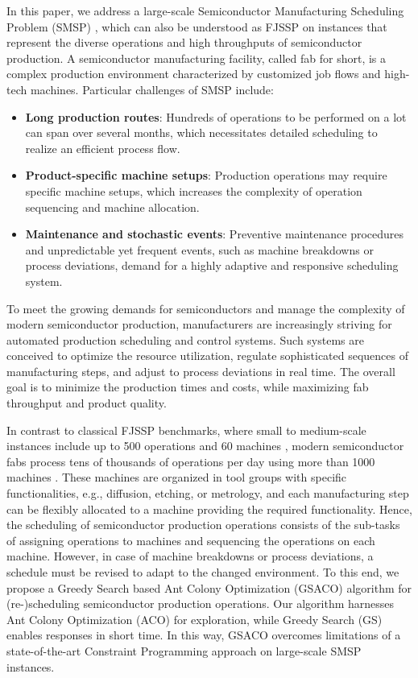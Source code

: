 \documentclass[runningheads]{llncs}
\begin{document}
In this paper, we address a large-scale Semiconductor Manufacturing Scheduling Problem (SMSP) \cite{kopp2020smt2020}, which can also be understood as FJSSP on instances that represent the diverse operations
and high throughputs of semiconductor production.
A semiconductor manufacturing facility, called fab for short, is a complex production environment characterized by customized job flows and high-tech machines.
Particular challenges of SMSP include:
\begin{itemize}
	\item \textbf{Long production routes}: Hundreds of operations to be performed on a lot can span over several months, which necessitates detailed scheduling to realize an efficient process flow.
	\item \textbf{Product-specific machine setups}: Production operations may require specific machine setups, which increases the complexity of operation sequencing and machine allocation.
	\item \textbf{Maintenance and stochastic events}: Preventive maintenance procedures and unpredictable yet frequent events, such as machine breakdowns or process deviations, demand for a highly adaptive and responsive scheduling system.
\end{itemize}

To meet the growing demands for semiconductors and manage the complexity of modern semiconductor production, manufacturers are increasingly striving for automated production scheduling and control systems. Such systems are conceived to optimize the resource utilization, regulate sophisticated sequences of manufacturing steps, and adjust to process deviations in real time. The overall goal is to minimize the production times and costs, while maximizing fab throughput and product quality.

In contrast to classical FJSSP benchmarks, where
small to medium-scale instances include up to 500 operations and 60 machines
\cite{behnke2012test},
modern semiconductor fabs
process tens of thousands of operations per day using more than 1000 machines
\cite{kopp2020smt2020}.
These machines are organized in tool groups with specific functionalities,
e.g., diffusion, etching, or metrology,
and each manufacturing step can be flexibly allocated to a machine 
providing the required functionality.
Hence, the scheduling of semiconductor production operations consists of the
sub-tasks of assigning operations to machines and sequencing the operations on each machine.
However, in case of machine breakdowns or process deviations,
a schedule must be revised to adapt to the changed environment.
To this end, we propose a Greedy Search based Ant Colony Optimization (GSACO)
algorithm for (re-)scheduling semiconductor production operations.
Our algorithm harnesses Ant Colony Optimization (ACO) \cite{dorigo2019ant} for exploration, while
Greedy Search (GS) \cite{papste82a} enables responses in short time. 
In this way,
GSACO overcomes limitations of a
state-of-the-art Constraint Programming approach \cite{pediga23a}
on large-scale SMSP %
instances.
\end{document}
